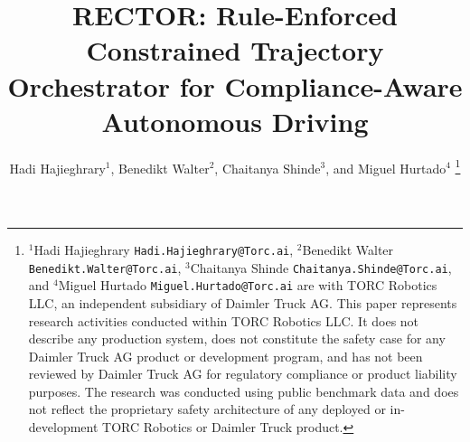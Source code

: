 \documentclass[lettersize,journal, twocolumn]{IEEEtran}
\begin{document}
\title{\textsc{RECTOR}: Rule-Enforced Constrained Trajectory Orchestrator
for Compliance-Aware Autonomous Driving}

\author{Hadi Hajieghrary$^{1}$, Benedikt Walter$^{2}$, Chaitanya Shinde$^{3}$, and Miguel Hurtado$^{4}$%
\thanks{$^{1}$Hadi Hajieghrary {\tt\small Hadi.Hajieghrary@Torc.ai}, $^{2}$Benedikt Walter {\tt\small Benedikt.Walter@Torc.ai}, $^{3}$Chaitanya Shinde {\tt\small Chaitanya.Shinde@Torc.ai}, and $^{4}$Miguel Hurtado {\tt\small Miguel.Hurtado@Torc.ai} are with TORC Robotics LLC, an independent subsidiary of Daimler Truck AG. This paper represents research activities conducted within TORC Robotics LLC. It does not describe any production system, does not constitute the safety case for any Daimler Truck AG product or development program, and has not been reviewed by Daimler Truck AG for regulatory compliance or product liability purposes. The research was conducted using public benchmark data and does not reflect the proprietary safety architecture of any deployed or in-development TORC Robotics or Daimler Truck product.}%
 }

\maketitle
\end{document}
